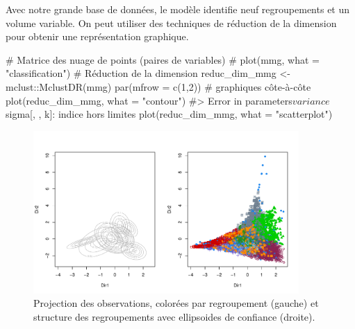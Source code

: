 \documentclass[
  11pt,
  letterpaper,
]{scrbook}
\newenvironment{Shaded}{\begin{snugshade}}{\end{snugshade}}
\newcommand{\AttributeTok}[1]{\textcolor[rgb]{0.40,0.45,0.13}{#1}}
\newcommand{\CommentTok}[1]{\textcolor[rgb]{0.37,0.37,0.37}{#1}}
\newcommand{\DecValTok}[1]{\textcolor[rgb]{0.68,0.00,0.00}{#1}}
\newcommand{\FunctionTok}[1]{\textcolor[rgb]{0.28,0.35,0.67}{#1}}
\newcommand{\NormalTok}[1]{\textcolor[rgb]{0.00,0.23,0.31}{#1}}
\newcommand{\OtherTok}[1]{\textcolor[rgb]{0.00,0.23,0.31}{#1}}
\newcommand{\SpecialCharTok}[1]{\textcolor[rgb]{0.37,0.37,0.37}{#1}}
\newcommand{\StringTok}[1]{\textcolor[rgb]{0.13,0.47,0.30}{#1}}
\theoremstyle{definition}
\theoremstyle{remark}
\begin{document}
Avec notre grande base de données, le modèle identifie neuf
regroupements et un volume variable. On peut utiliser des techniques de
réduction de la dimension pour obtenir une représentation graphique.

\begin{Shaded}
\begin{Highlighting}[]
\CommentTok{\# Matrice des nuage de points (paires de variables)}
\CommentTok{\# plot(mmg, what = "classification")}
\CommentTok{\# Réduction de la dimension}
\NormalTok{reduc\_dim\_mmg }\OtherTok{\textless{}{-}}\NormalTok{ mclust}\SpecialCharTok{::}\FunctionTok{MclustDR}\NormalTok{(mmg)}
\FunctionTok{par}\NormalTok{(}\AttributeTok{mfrow =} \FunctionTok{c}\NormalTok{(}\DecValTok{1}\NormalTok{,}\DecValTok{2}\NormalTok{)) }\CommentTok{\# graphiques côte{-}à{-}côte}
\FunctionTok{plot}\NormalTok{(reduc\_dim\_mmg, }\AttributeTok{what =} \StringTok{"contour"}\NormalTok{)}
\CommentTok{\#\textgreater{} Error in parameters$variance$sigma[, , k]: indice hors limites}
\FunctionTok{plot}\NormalTok{(reduc\_dim\_mmg, }\AttributeTok{what =} \StringTok{"scatterplot"}\NormalTok{)}
\end{Highlighting}
\end{Shaded}

\begin{figure}[ht!]

{\centering \includegraphics[width=0.9\textwidth,height=\textheight]{regroupements_files/figure-pdf/fig-classifreducmclust-1.pdf}

}

\caption{\label{fig-classifreducmclust}Projection des observations,
colorées par regroupement (gauche) et structure des regroupements avec
ellipsoides de confiance (droite).}

\end{figure}
\end{document}

